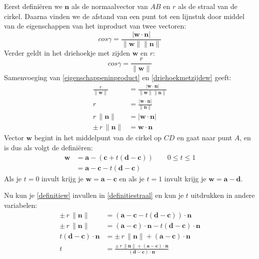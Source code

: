 \documentclass[12pt,a4paper]{article}
\begin{document}
	Eerst defini\"{e}ren we $\mathbf{n}$ als de normaalvector van $AB$ en $r$ als de straal van de cirkel. Daarna vinden we de afstand van een punt tot een lijnstuk door middel van de eigenschappen van het inproduct van twee vectoren:
	\begin{equation}
		\label{eigenschappeninproduct}
		cos \gamma = \frac{|\mathbf{w} \cdot \mathbf{n}|}{\| \mathbf{w} \| \| \mathbf{n} \|}
	\end{equation}
	Verder geldt in het driehoekje met zijden $\mathbf{w}$ en $r$:
	\begin{equation}
		\label{driehoekmetzijdew}
		cos \gamma = \frac{r}{\| \mathbf{w}\| }
	\end{equation}
	Samenvoeging van \eqref{eigenschappeninproduct} en \eqref{driehoekmetzijdew} geeft:
	\begin{equation}
		\label{definitiestraal}
		\begin{aligned}
			\frac{r}{\| \mathbf{w}\| } &= \frac{|\mathbf{w} \cdot \mathbf{n}|}{\| \mathbf{w} \| \| \mathbf{n} \|} \\
			r &= \frac{|\mathbf{w} \cdot \mathbf{n}|}{\| \mathbf{n} \|} \\
			r \, \| \mathbf{n} \| &= |\mathbf{w} \cdot \mathbf{n}| \\
			\pm \, r \, \| \mathbf{n} \| &= \mathbf{w} \cdot \mathbf{n}
		\end{aligned}
	\end{equation}
	Vector $\mathbf{w}$ begint in het middelpunt van de cirkel op $CD$ en gaat naar punt $A$, en is dus als volgt de defini\"{e}ren:
	\begin{equation}
		\label{definitiew}
		\begin{aligned}
			\mathbf{w} &= \mathbf{a} - (\mathbf{c} + t \left(\mathbf{d} - \mathbf{c} \right)) \qquad 0 \leq t \leq 1 \\
			&= \mathbf{a} - \mathbf{c} - t \left(\mathbf{d} - \mathbf{c} \right)
		\end{aligned}
	\end{equation}
	Als je $t=0$ invult krijg je $\mathbf{w} = \mathbf{a} - \mathbf{c}$ en als je $t=1$ invult krijg je $\mathbf{w} = \mathbf{a} - \mathbf{d}$.
	
	Nu kun je \eqref{definitiew} invullen in \eqref{definitiestraal} en kun je $t$ uitdrukken in andere variabelen:
	\begin{equation}
		\begin{aligned}
			\pm \, r \, \| \mathbf{n} \| &= (\mathbf{a} - \mathbf{c} - t \left(\mathbf{d} - \mathbf{c} \right)) \cdot \mathbf{n} \\
			\pm \, r \, \| \mathbf{n} \| &= (\mathbf{a} - \mathbf{c}) \cdot \mathbf{n} - t \left(\mathbf{d} - \mathbf{c} \right) \cdot \mathbf{n} \\
			t \left(\mathbf{d} - \mathbf{c} \right) \cdot \mathbf{n} &= \pm \, r \, \| \mathbf{n} \| + (\mathbf{a} - \mathbf{c}) \cdot \mathbf{n} \\
			t &= \frac{\pm \, r \, \| \mathbf{n} \| + (\mathbf{a} - \mathbf{c}) \cdot \mathbf{n}}{\left(\mathbf{d} - \mathbf{c} \right) \cdot \mathbf{n}}
		\end{aligned}
	\end{equation}
	
\end{document}
